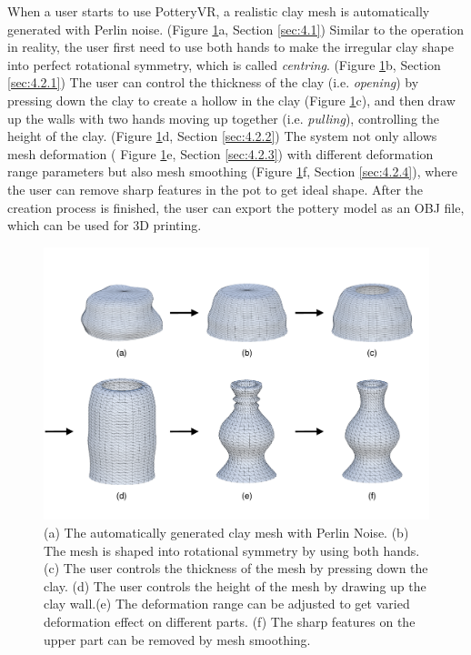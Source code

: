 \documentclass{svjour3}                     %
\begin{document}
When a user starts to use PotteryVR, a realistic clay mesh is automatically generated with Perlin noise. (Figure \ref{fig:2}a, Section \ref{sec:4.1})
Similar to the operation in reality, the user first need to use both hands to make the irregular clay shape into perfect rotational symmetry, which is called \textit{centring}. (Figure \ref{fig:2}b, Section \ref{sec:4.2.1})
The user can control the thickness of the clay (i.e. \textit{opening}) by pressing down the clay to create a hollow in the clay (Figure \ref{fig:2}c), 
and then draw up the walls with two hands moving up together (i.e. \textit{pulling}), controlling the height of the clay. (Figure \ref{fig:2}d, Section \ref{sec:4.2.2})
The system not only allows mesh deformation ( Figure \ref{fig:2}e, Section \ref{sec:4.2.3}) with different deformation range parameters but also mesh smoothing (Figure \ref{fig:2}f, Section \ref{sec:4.2.4}), where the user can remove sharp features in the pot to get ideal shape.
After the creation process is finished, the user can export the pottery model as an OBJ file, which can be used for 3D printing.

\begin{figure}
\includegraphics[width=\textwidth]{fig2.pdf}
\caption{(a) The automatically generated clay mesh with Perlin Noise. (b) The mesh is shaped into rotational symmetry by using both hands. (c) The user controls the thickness of the mesh by pressing down the clay. (d) The user controls the height of the mesh by drawing up the clay wall.(e) The deformation range can be adjusted to get varied deformation effect on different parts. (f) The sharp features on the upper part can be removed by mesh smoothing.}
\label{fig:2}
\end{figure}
\end{document}
